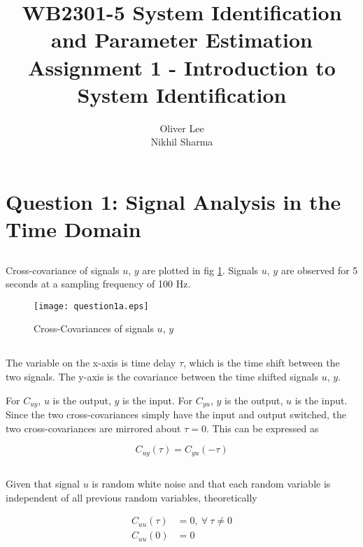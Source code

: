 \documentclass[times,12pt,reqno]{amsart}
\title{WB2301-5 System Identification and Parameter Estimation \\
Assignment 1 - Introduction to System Identification}
\author{Oliver Lee\\Nikhil Sharma}
\begin{document}
\maketitle

\section{Question 1: Signal Analysis in the Time Domain}

\subsection{}

Cross-covariance of signals $u$, $y$ are plotted in fig \ref{fig:q1a}. Signals
$u$, $y$ are observed for 5 seconds at a sampling frequency of 100 Hz.

\begin{figure}[H]
    \begin{center}
        \texttt{[image: question1a.eps]}
    \end{center}
    \caption{Cross-Covariances of signals $u$, $y$}
    \label{fig:q1a}
\end{figure}

\subsection{}
The variable on the x-axis is time delay $\tau$, which is the time shift
between the two signals. The y-axis is the covariance between the time shifted
signals $u$, $y$.

For $C_{uy}$, $u$ is the output, $y$ is the input. For $C_{yu}$, $y$ is the
output, $u$ is the input. Since the two cross-covariances simply have the input
and output switched, the two cross-covariances are mirrored about $\tau = 0$.
This can be expressed as

\begin{equation*}
    C_{uy}(\tau) = C_{yu}(-\tau)
\end{equation*}

\subsection{}
Given that signal $u$ is random white noise and that each random variable is
independent of all previous random variables, theoretically

\begin{align*}
    C_{uu}(\tau) &= 0, \: \forall \: \tau \neq 0 \\
    C_{uu}(0) &= 0
\end{align*}
\end{document}
